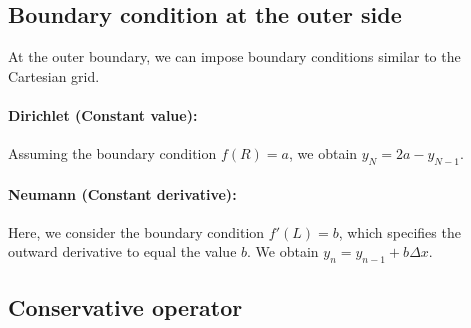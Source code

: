 \documentclass[
	superscriptaddress,
	twocolumn,
	aps, prl
]{revtex4-1}
\newcommand{\dx}{\Delta x}
\begin{document}
\subsection{Boundary condition at the outer side}
At the outer boundary, we can impose boundary conditions similar to the Cartesian grid.

\paragraph{Dirichlet (Constant value):}
Assuming the boundary condition $f(R) = a$, we obtain $y_N = 2a - y_{N-1}$.

\paragraph{Neumann (Constant derivative):}
Here, we consider the boundary condition $f'(L) = b$, which specifies the outward derivative to equal the value $b$.
We obtain $y_n = y_{n-1} + b \dx$.

\subsection{Conservative operator}
\end{document}
